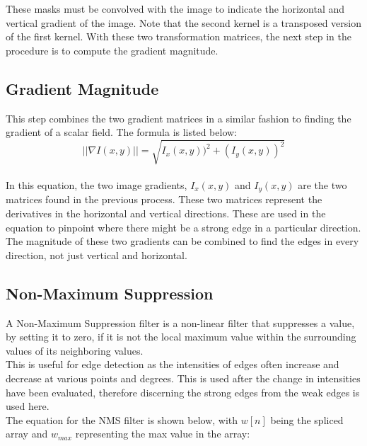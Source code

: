 \documentclass{article}
\begin{document}
	These masks must be convolved with the image to indicate the horizontal and vertical gradient of the image. Note that the second kernel is a transposed version of the first kernel. With these two transformation matrices, the next step in the procedure is to compute the gradient magnitude.
	
	\subsection{Gradient Magnitude}
	
	This step combines the two gradient matrices in a similar fashion to finding the gradient of a scalar field. The formula is listed below:\\
	
	\begin{equation}
		||\nabla I(x,y)|| = \sqrt{I_{x}(x,y))^2 + (I_{y}(x,y))^2}
	\end{equation}\\
	
	In this equation, the two image gradients, $I_{x}(x,y)$ and $ I_{y}(x,y)$ are the two matrices found in the previous process. These two matrices represent the derivatives in the horizontal and vertical directions. These are used in the equation to pinpoint where there might be a strong edge in a particular direction. The magnitude of these two gradients can be combined to find the edges in every direction, not just vertical and horizontal.
	
	\subsection{Non-Maximum Suppression}
	
	 A Non-Maximum Suppression filter is a non-linear filter that suppresses a value, by setting it to zero, if it is not the local maximum value within the surrounding values of its neighboring values.\\
	 
	 This is useful for edge detection as the intensities of edges often increase and decrease at various points and degrees. This is used after the change in intensities have been evaluated, therefore discerning the strong edges from the weak edges is used here.\\
	 
	 The equation for the NMS filter is shown below, with $w[n]$ being the spliced array and $w_{max}$ representing the max value in the array:\\
	 
\end{document}
